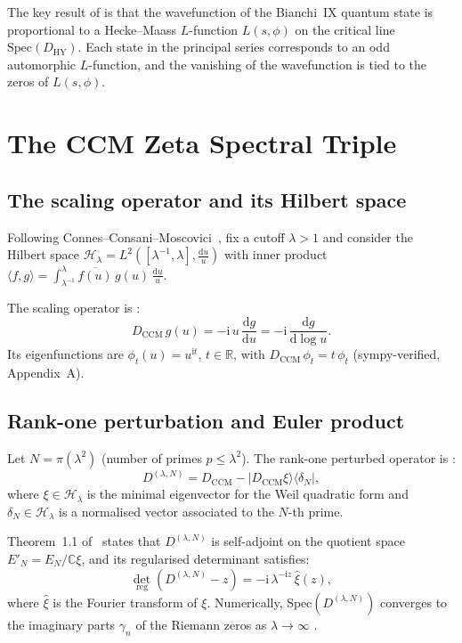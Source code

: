 \documentclass[11pt]{article}
\newcommand{\HY}{\mathrm{HY}}
\newcommand{\CCM}{\mathrm{CCM}}
\newcommand{\Spec}{\mathrm{Spec}}
\newcommand{\dd}{\mathrm{d}}
\newcommand{\ii}{\mathrm{i}}
\newcommand{\Lam}{\lambda}
\begin{document}
The key result of \cite{HY2025} is that the wavefunction of the
Bianchi~IX quantum state is proportional to a Hecke--Maass
$L$-function $L(s,\phi)$ on the critical line $\Spec(D_\HY)$. Each
state in the principal series corresponds to an odd automorphic
$L$-function, and the vanishing of the wavefunction is tied to the
zeros of $L(s,\phi)$.

\section{The CCM Zeta Spectral Triple}
\label{sec:CCM}

\subsection{The scaling operator and its Hilbert space}

Following Connes--Consani--Moscovici~\cite{CCM2025}, fix a cutoff
$\Lam > 1$ and consider the Hilbert space
$\mathcal{H}_\Lam = L^2\!\left([\Lam^{-1},\Lam], \frac{\dd u}{u}\right)$
with inner product $\langle f,g\rangle = \int_{\Lam^{-1}}^{\Lam}
\overline{f(u)}\,g(u)\,\frac{\dd u}{u}$.

The scaling operator is \cite[eq.~(5.14)]{CCM2025}:
\begin{equation}
  D_\CCM\,g(u) = -\ii\,u\,\frac{\dd g}{\dd u}
  = -\ii\,\frac{\dd g}{\dd \log u}.
  \label{eq:D-CCM}
\end{equation}
Its eigenfunctions are $\phi_t(u) = u^{\ii t}$, $t \in \mathbb{R}$,
with $D_\CCM\,\phi_t = t\,\phi_t$ (sympy-verified, Appendix~A).

\subsection{Rank-one perturbation and Euler product}

Let $N = \pi(\Lam^2)$ (number of primes $p \le \Lam^2$). The rank-one
perturbed operator is \cite[Thm.~1.1(i)]{CCM2025}:
\begin{equation}
  D^{(\Lam,N)} = D_\CCM - |D_\CCM\xi\rangle\langle\delta_N|,
  \label{eq:D-perturbed}
\end{equation}
where $\xi \in \mathcal{H}_\Lam$ is the minimal eigenvector for the
Weil quadratic form and $\delta_N \in \mathcal{H}_\Lam$ is a
normalised vector associated to the $N$-th prime.

Theorem~1.1 of~\cite{CCM2025} states that $D^{(\Lam,N)}$ is
self-adjoint on the quotient space $E'_N = E_N/\mathbb{C}\xi$, and its
regularised determinant satisfies:
\begin{equation}
  \det_{\mathrm{reg}}\!\left(D^{(\Lam,N)} - z\right)
  = -\ii\,\Lam^{-\ii z}\,\hat{\xi}(z),
  \label{eq:reg-det}
\end{equation}
where $\hat{\xi}$ is the Fourier transform of $\xi$. Numerically,
$\Spec(D^{(\Lam,N)})$ converges to the imaginary parts $\gamma_n$ of
the Riemann zeros as $\Lam \to \infty$ \cite{CCM2025}.
\end{document}
